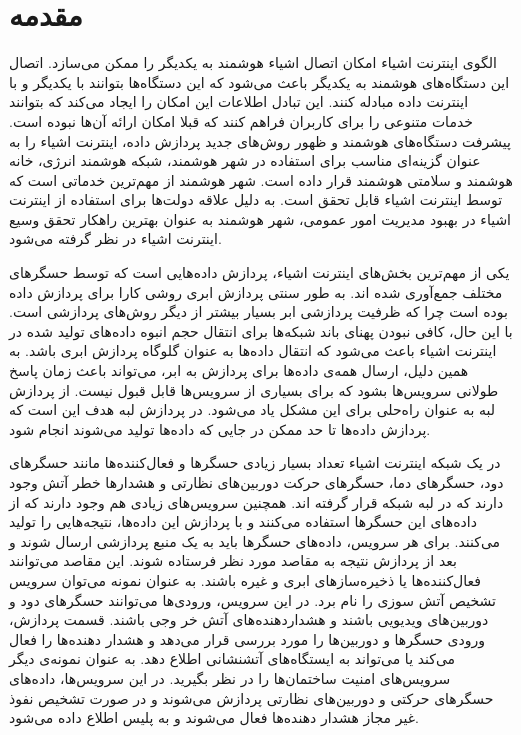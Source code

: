 
\chapter{مقدمه}
  \thispagestyle{empty}
    الگوی اینترنت اشیاء امکان اتصال اشیاء هوشمند به یکدیگر را ممکن می‌سازد.
    اتصال این دستگاه‌های هوشمند به یکدیگر باعث می‌شود که این دستگاه‌ها بتوانند با یکدیگر و با اینترنت داده مبادله کنند.
    این تبادل اطلاعات این امکان را ایجاد می‌کند که بتوانند خدمات متنوعی را برای کاربران فراهم کنند که قبلا امکان ارائه آن‌ها نبوده است.
    پیشرفت دستگاه‌های هوشمند و ظهور روش‌های جدید پردازش داده، اینترنت اشیاء را به عنوان گزینه‌ای مناسب برای استفاده در شهر هوشمند، شبکه هوشمند انرژی، خانه هوشمند و سلامتی هوشمند قرار داده است.
    شهر هوشمند از مهم‌ترین خدماتی است که توسط اینترنت اشیاء قابل تحقق است.
    به دلیل علاقه دولت‌‌ها برای استفاده از اینترنت اشیاء در بهبود مدیریت امور عمومی، شهر هوشمند به عنوان بهترین راهکار تحقق وسیع اینترنت اشیاء در نظر گرفته می‌شود.

    یکی از مهم‌ترین بخش‌های اینترنت اشیاء، پردازش داده‌هایی است که توسط حسگر‌های مختلف جمع‌آوری شده‌ اند.
    به طور سنتی پردازش ابری روشی کارا برای پردازش داده بوده است چرا که ظرفیت پردازشی ابر بسیار بیشتر از دیگر روش‌های پردازشی است.
    با این حال، کافی نبودن پهنای باند شبکه‌ها برای انتقال حجم انبوه داده‌های تولید شده در اینترنت اشیاء باعث می‌شود که انتقال داده‌ها به عنوان گلوگاه پردازش ابری باشد.
    به همین دلیل، ارسال همه‌ی داده‌ها برای پردازش به ابر، می‌تواند باعث زمان پاسخ طولانی سرویس‌ها بشود که برای بسیاری از سرویس‌ها قابل قبول نیست.
    از پردازش لبه به عنوان راه‌حلی برای این مشکل یاد می‌شود.
    در پردازش لبه هدف این است که پردازش داده‌ها تا حد ممکن در جایی که داده‌ها تولید می‌شوند انجام شود.

    در یک شبکه اینترنت اشیاء تعداد بسیار زیادی حسگر‌ها و فعال‌کننده‌ها مانند حسگر‌های دود، حسگر‌های دما، حسگر‌های حرکت دوربین‌های نظارتی و هشدار‌ها خطر آتش وجود دارند که در لبه شبکه قرار گرفته اند.
    همچنین سرویس‌های زیادی هم وجود دارند که از داده‌های این حسگر‌ها استفاده می‌کنند و با پردازش این داده‌ها، نتیجه‌هایی را تولید می‌کنند.
    برای هر سرویس، داده‌های حسگر‌ها باید به یک منبع پردازشی ارسال شوند و بعد از پردازش نتیجه به مقاصد مورد نظر فرستاده شوند.
    این مقاصد می‌توانند فعال‌کننده‌ها یا ذخیره‌سازهای ابری و غیره باشند.
    به عنوان نمونه می‌توان سرویس تشخیص آتش سوزی را نام برد.
    در این سرویس، ورودی‌ها می‌توانند حسگر‌های دود و دوربین‌های ویدیویی باشند و هشداردهنده‌‌های آتش خر وجی باشند.
    قسمت پردازش، ورودی حسگر‌ها و دوربین‌ها را مورد بررسی قرار می‌دهد و هشدار دهنده‌ها را فعال می‌کند یا می‌تواند به ایستگاه‌‌های آتشنشانی اطلاع دهد.
    به عنوان نمونه‌ی دیگر سرویس‌های امنیت ساختمان‌ها را در نظر بگیرید.
    در این سرویس‌ها، داده‌های حسگر‌های حرکتی و دوربین‌های نظارتی پردازش می‌شوند و در صورت تشخیص نفوذ غیر مجاز هشدار دهنده‌ها فعال می‌شوند و به پلیس اطلاع داده می‌شود.

